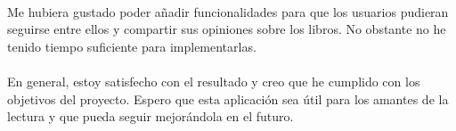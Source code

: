 \documentclass[a4paper,10pt]{report}
\begin{document}
    \paragraph*{}{Me hubiera gustado poder añadir funcionalidades para que los usuarios pudieran seguirse entre ellos y compartir sus opiniones sobre los libros. No obstante no he tenido tiempo suficiente para implementarlas.}
    \paragraph*{}{En general, estoy satisfecho con el resultado y creo que he cumplido con los objetivos del proyecto. Espero que esta aplicación sea útil para los amantes de la lectura y que pueda seguir mejorándola en el futuro.}
  
  \printbibliography[title=Bibliografía]
\end{document}
